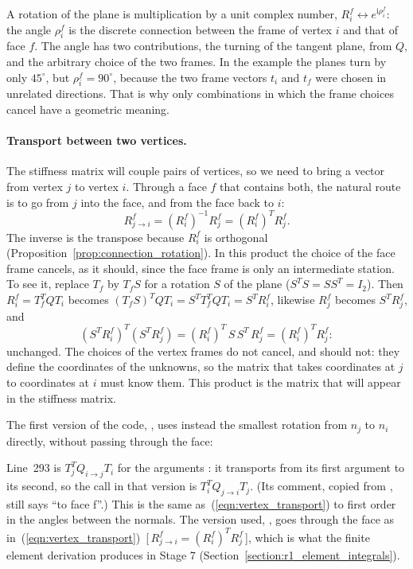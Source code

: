 A rotation of the plane is multiplication by a unit complex number, $R_i^f \leftrightarrow e^{\mathrm i \rho_i^f}$: the angle $\rho_i^f$ is the discrete connection between the frame of vertex $i$ and that of face $f$. The angle has two contributions, the turning of the tangent plane, from $Q$, and the arbitrary choice of the two frames. In the example the planes turn by only $45^\circ$, but $\rho_i^f = 90^\circ$, because the two frame vectors $t_i$ and $t_f$ were chosen in unrelated directions. That is why only combinations in which the frame choices cancel have a geometric meaning.

\paragraph{Transport between two vertices.} The stiffness matrix will couple pairs of vertices, so we need to bring a vector from vertex $j$ to vertex $i$. Through a face $f$ that contains both, the natural route is to go from $j$ into the face, and from the face back to $i$:
\begin{equation}
\label{eqn:vertex_transport}
R_{j \to i}^f = (R_i^f)^{-1} R_j^f = (R_i^f)^T R_j^f .
\end{equation}
The inverse is the transpose because $R_i^f$ is orthogonal (Proposition~\ref{prop:connection_rotation}). In this product the choice of the face frame cancels, as it should, since the face frame is only an intermediate station. To see it, replace $T_f$ by $T_f S$ for a rotation $S$ of the plane ($S^T S = S S^T = I_2$). Then $R_i^f = T_f^T Q T_i$ becomes $(T_f S)^T Q T_i = S^T T_f^T Q T_i = S^T R_i^f$, likewise $R_j^f$ becomes $S^T R_j^f$, and
\begin{equation*}
(S^T R_i^f)^T (S^T R_j^f) = (R_i^f)^T\, S\, S^T\, R_j^f = (R_i^f)^T R_j^f :
\end{equation*}
unchanged. The choices of the vertex frames do not cancel, and should not: they define the coordinates of the unknowns, so the matrix that takes coordinates at $j$ to coordinates at $i$ must know them. This product is the matrix that will appear in the stiffness matrix.

The first version of the code, , uses instead the smallest rotation from $n_j$ to $n_i$ directly, without passing through the face:

Line~293 is $T_j^T Q_{i\to j} T_i$ for the arguments : it transports from its first argument to its second, so the call  in that version is $T_i^T Q_{j \to i} T_j$. (Its comment, copied from , still says ``to face f''.) This is the same as~(\ref{eqn:vertex_transport}) to first order in the angles between the normals. The version used, , goes through the face as in~(\ref{eqn:vertex_transport})~[\,$R^f_{j\to i} = (R_i^f)^T R_j^f$\,], which is what the finite element derivation produces in Stage 7 (Section~\ref{section:r1_element_integrals}).

